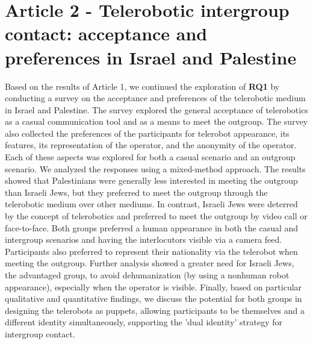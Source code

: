 \documentclass[dissertation,math,vertlayout,pdfa,colorlinks]{aaltoseries}
\begin{document}
\section{Article 2 - Telerobotic intergroup contact: acceptance and preferences in Israel and Palestine}
Based on the results of Article 1, we continued the exploration of \textbf{RQ1} by conducting a survey on the acceptance and preferences of the telerobotic medium in Israel and Palestine. The survey explored the general acceptance of telerobotics as a casual communication tool and as a means to meet the outgroup. The survey also collected the preferences of the participants for telerobot appearance, its features, its representation of the operator, and the anonymity of the operator. Each of these aspects was explored for both a casual scenario and an outgroup scenario. We analyzed the responses using a mixed-method approach. The results showed that Palestinians were generally less interested in meeting the outgroup than Israeli Jews, but they preferred to meet the outgroup through the telerobotic medium over other mediums. In contrast, Israeli Jews were deterred by the concept of telerobotics and preferred to meet the outgroup by video call or face-to-face. Both groups preferred a human appearance in both the casual and intergroup scenarios and having the interlocutors visible via a camera feed. Participants also preferred to represent their nationality via the telerobot when meeting the outgroup. Further analysis showed a greater need for Israeli Jews, the advantaged group, to avoid dehumanization (by using a nonhuman robot appearance), especially when the operator is visible. Finally, based on particular qualitative and quantitative findings, we discuss the potential for both groups in designing the telerobots as puppets, allowing participants to be themselves and a different identity simultaneously, supporting the 'dual identity' strategy for intergroup contact.
\end{document}

